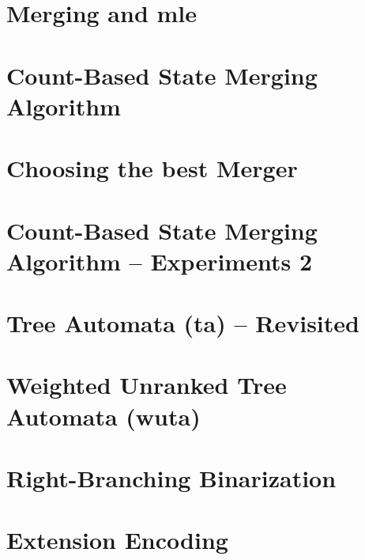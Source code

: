 \documentclass{beamer}
\begin{document}
\section{Merging and mle}



\section{Count-Based State Merging Algorithm}

\begin{frame}{\secname}
	
\end{frame}


\section{Choosing the best Merger}

\begin{frame}{\secname}
	
\end{frame}

\begin{frame}{\secname}
	\begin{center}
		
	\end{center}
\end{frame}


\section{Count-Based State Merging Algorithm – Experiments 2}

\begin{frame}{\secname}{}
	\centering
	
\end{frame}


\section{Tree Automata (ta) – Revisited}



\section{Weighted Unranked Tree Automata (wuta)}


\iffalse
\begin{frame}{\secname}
	\centering
	
\end{frame}
\fi


\section{Right-Branching Binarization}

\begin{frame}{\secname}
	
\end{frame}


\section{Extension Encoding}

\begin{frame}{\secname}
	
\end{frame}
\end{document}
